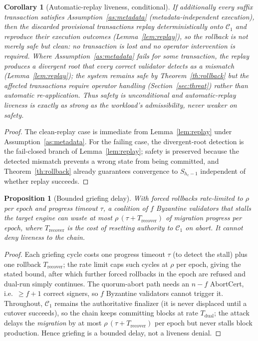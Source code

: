 \documentclass[journal]{IEEEtran}
\newtheorem{corollary}{Corollary}
\newtheorem{proposition}{Proposition}
\theoremstyle{definition}
\theoremstyle{remark}
\begin{document}
\begin{corollary}[Automatic-replay liveness, conditional]
\label{cor:replay-liveness}
If additionally every suffix transaction satisfies Assumption~\ref{as:metadata}
(metadata-independent execution), then the discarded provisional transactions replay
deterministically onto $\mathcal{C}_1$ and reproduce their execution outcomes
(Lemma~\ref{lem:replay}), so the rollback is not merely safe but \emph{clean}: no transaction is
lost and no operator intervention is required. Where Assumption~\ref{as:metadata} fails for some
transaction, the replay produces a divergent root that every correct validator \emph{detects} as
a mismatch (Lemma~\ref{lem:replay}); the system remains safe by Theorem~\ref{th:rollback} but the
affected transactions require operator handling (Section~\ref{sec:threat}) rather than automatic
re-application. Thus safety is unconditional and automatic-replay liveness is exactly as strong as
the workload's admissibility, never weaker on safety.
\end{corollary}
\begin{proof}
The clean-replay case is immediate from Lemma~\ref{lem:replay} under
Assumption~\ref{as:metadata}. For the failing case, the divergent-root detection is the
fail-closed branch of Lemma~\ref{lem:replay}; safety is preserved because the detected mismatch
prevents a wrong state from being committed, and Theorem~\ref{th:rollback} already guarantees
convergence to $S_{h_{\mathrm{c}}-1}$ independent of whether replay succeeds.
\end{proof}

\begin{proposition}[Bounded griefing delay]
\label{prop:grief}
With forced rollbacks rate-limited to $\rho$ per epoch and progress timeout $\tau$, a coalition of
$f$ Byzantine validators that stalls the target engine can waste at most
$\rho\,(\tau + T_{\mathrm{recover}})$ of migration progress per epoch, where $T_{\mathrm{recover}}$
is the cost of resetting authority to $\mathcal{C}_1$ on abort. It cannot deny liveness to the chain.
\end{proposition}
\begin{proof}
Each griefing cycle costs one progress timeout $\tau$ (to detect the stall) plus one rollback
$T_{\mathrm{recover}}$; the rate limit caps such cycles at $\rho$ per epoch, giving the stated bound,
after which further forced rollbacks in the epoch are refused and dual-run simply continues. The
quorum-abort path needs an $n-f$ AbortCert, i.e.\ $\ge f+1$ correct signers, so $f$ Byzantine
validators cannot trigger it. Throughout, $\mathcal{C}_1$ remains the authoritative finalizer
(it is never displaced until a cutover succeeds), so the chain keeps committing blocks at rate
$T_{\mathrm{dual}}$; the attack delays the \emph{migration} by at most $\rho\,(\tau+T_{\mathrm{recover}})$
per epoch but never stalls block production. Hence griefing is a bounded delay, not a liveness denial.
\end{proof}
\end{document}
